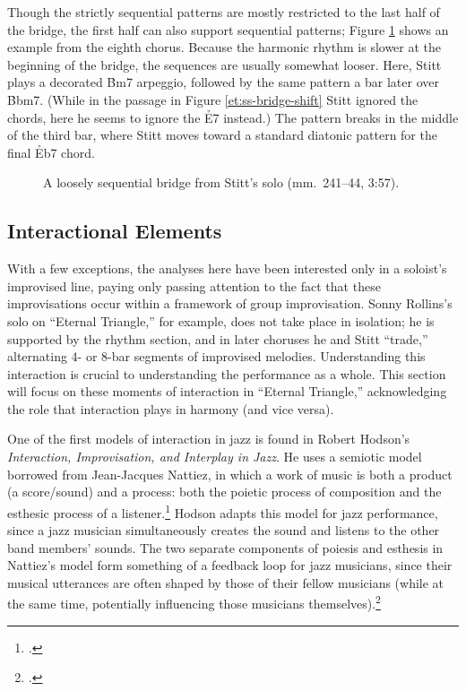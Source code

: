 Though the strictly sequential patterns are mostly restricted to the last half
of the bridge, the first half can also support sequential patterns; Figure
\ref{et:ss-seq-first-half} shows an example from the eighth chorus. Because
the harmonic rhythm is slower at the beginning of the bridge, the sequences
are usually somewhat looser. Here, Stitt plays a decorated \h{Bm7} arpeggio,
followed by the same pattern a bar later over \h{Bbm7}. (While in the passage
in Figure \ref{et:ss-bridge-shift} Stitt ignored the \ii chords, here he seems
to ignore the \h{E7} instead.) The pattern breaks in the middle of the third
bar, where Stitt moves toward a standard diatonic pattern for the final
\h{Eb7} chord.

\begin{figure}[tbp]
  \caption[A loosely sequential bridge from Stitt's solo.]{%
    A loosely sequential bridge from Stitt's solo (mm.~241--44, 3:57).}
  \label{et:ss-seq-first-half}
\end{figure}

\FloatBarrier
\subsection{Interactional Elements}

With a few exceptions, the analyses here have been interested only in a
soloist's improvised line, paying only passing attention to the fact that
these improvisations occur within a framework of group improvisation. Sonny
Rollins's solo on ``Eternal Triangle,'' for example, does not take place in
isolation; he is supported by the rhythm section, and in later choruses he and
Stitt ``trade,'' alternating 4- or 8-bar segments of improvised melodies.
Understanding this interaction is crucial to understanding the performance as
a whole. This section will focus on these moments of interaction in ``Eternal
Triangle,'' acknowledging the role that interaction plays in harmony (and vice
versa).

One of the first models of interaction in jazz is found in Robert Hodson's
\emph{Interaction, Improvisation, and Interplay in Jazz}. He uses a semiotic
model borrowed from Jean-Jacques Nattiez, in which a work of music is both a
product (a score/sound) and a process: both the poietic process of composition
and the esthesic process of a listener.\footcite[14--15]{hodson:2007} Hodson
adapts this model for jazz performance, since a jazz musician simultaneously
creates the sound and listens to the other band members' sounds. The two
separate components of poiesis and esthesis in Nattiez's model form something
of a feedback loop for jazz musicians, since their musical utterances are
often shaped by those of their fellow musicians (while at the same time,
potentially influencing those musicians
themselves).\footcite[15--16]{hodson:2007}

